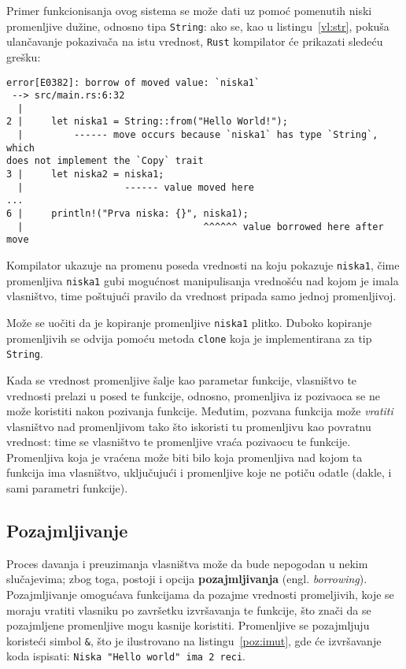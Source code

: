\documentclass[12pt,oneside]{memoir}
\begin{document}
Primer funkcionisanja ovog sistema se može dati uz pomoć pomenutih niski promenljive dužine,
odnosno tipa \texttt{String}: ako se, kao u listingu~\ref{vl:str}, pokuša
ulančavanje pokazivača na istu vrednost, \texttt{Rust} kompilator će prikazati sledeću grešku:

\begin{lstlisting}[language={}, style=text]
error[E0382]: borrow of moved value: `niska1`
 --> src/main.rs:6:32
  |
2 |     let niska1 = String::from("Hello World!");
  |         ------ move occurs because `niska1` has type `String`, which
does not implement the `Copy` trait
3 |     let niska2 = niska1;
  |                  ------ value moved here
...
6 |     println!("Prva niska: {}", niska1);
  |                                ^^^^^^ value borrowed here after move
\end{lstlisting}

Kompilator ukazuje na promenu poseda vrednosti na koju pokazuje \texttt{niska1}, čime promenljiva
\texttt{niska1} gubi mogućnost manipulisanja vrednošću nad kojom je imala vlasništvo, time poštujući
pravilo da vrednost pripada samo jednoj promenljivoj.



Može se uočiti da je kopiranje promenljive \texttt{niska1} plitko. Duboko kopiranje promenljivih
se odvija pomoću metoda \texttt{clone} koja je implementirana za tip \texttt{String}.


Kada se vrednost promenljive šalje kao parametar funkcije, vlasništvo te vrednosti prelazi
u posed te funkcije, odnosno, promenljiva iz pozivaoca se ne može koristiti nakon pozivanja funkcije.
Međutim, pozvana funkcija može \emph{vratiti} vlasništvo nad promenljivom tako što iskoristi tu
promenljivu kao povratnu vrednost: time se vlasništvo te promenljive vraća pozivaocu te funkcije.
Promenljiva koja je vraćena može biti bilo koja promenljiva nad kojom ta funkcija ima vlasništvo,
uključujući i promenljive koje ne potiču odatle (dakle, i sami parametri funkcije).

\subsection{Pozajmljivanje}
Proces davanja i preuzimanja vlasništva može da bude nepogodan u nekim slučajevima; zbog toga,
postoji i opcija \textbf{pozajmljivanja} (engl. \emph{borrowing}). Pozajmljivanje omogućava
funkcijama da pozajme vrednosti promeljivih, koje se moraju vratiti vlasniku po završetku
izvršavanja te funkcije, što znači da se pozajmljene promenljive mogu kasnije koristiti.
Promenljive se pozajmljuju koristeći simbol \texttt{\&}, što je ilustrovano na
listingu~\ref{poz:imut}, gde će izvršavanje koda ispisati: \texttt{Niska "Hello world"
ima 2 reci}.
\end{document}
